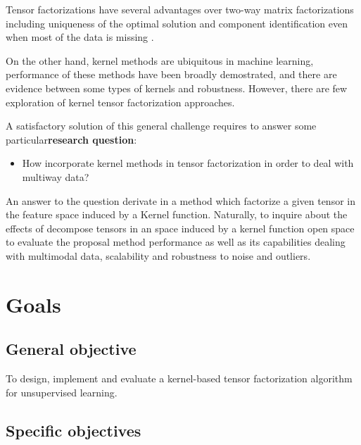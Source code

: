 \documentclass[letterpaper,12pt]{article}
\begin{document}
Tensor factorizations have several advantages over two-way matrix factorizations including uniqueness of the optimal solution and component identification even when most of the data is missing  \cite{Morup2011}.

On the other hand, kernel methods are ubiquitous in machine learning, performance of these methods have been broadly demostrated, and there are evidence between some types of kernels and robustness. However, there are few exploration of kernel tensor factorization approaches.

A satisfactory solution of this general challenge requires to answer some particular\textbf{research question}: 

\begin{itemize}
 \item How incorporate kernel methods in tensor factorization in order to deal with multiway data? %
\end{itemize}

An answer to the question derivate in a method which factorize a given tensor in the feature space induced by a Kernel function. Naturally, to inquire about the effects of decompose tensors in an space induced by a kernel function open space to evaluate the proposal method performance as well as its capabilities dealing with multimodal data, scalability and robustness to noise and outliers.




\section{Goals}


 \subsection*{General objective}

To design, implement and evaluate a kernel-based tensor factorization algorithm for unsupervised learning.
 
\subsection*{Specific objectives}
\end{document}
